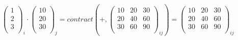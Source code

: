 \documentclass[acmlarge]{acmart}
\begin{document}
\begin{figure}[t]
{  \\
  $\begin{pmatrix} 1 \\ 2 \\ 3 \\ \end{pmatrix}_{i} \cdot \begin{pmatrix} 10 \\ 20 \\ 30 \\ \end{pmatrix}_{j} = contract(+, \begin{pmatrix} 10 & 20 & 30 \\ 20 & 40 & 60 \\ 30 & 60 & 90 \\ \end{pmatrix}_{ij})
  = \begin{pmatrix} 10 & 20 & 30 \\ 20 & 40 & 60 \\ 30 & 60 & 90 \\ \end{pmatrix}_{ij}$ \\
  }

\end{figure}
\end{document}
